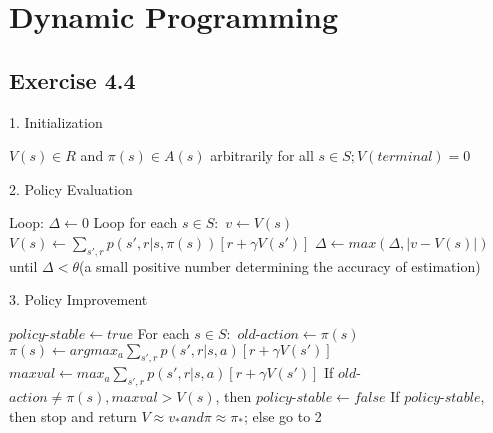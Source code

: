 \documentclass{report}
\begin{document}
\chapter{Dynamic Programming}

\section*{Exercise 4.4}
1. Initialization 
\begin{algorithmic}
\State $ V(s) \in R$ and $\pi(s) \in A(s)$ arbitrarily for all $s \in S; V(terminal)=0$
\end{algorithmic}
2. Policy Evaluation
\begin{algorithmic}
\State Loop:
\Indent
    \State $\Delta \leftarrow 0$
    \State Loop for each $s\in S:$
    \Indent
        \State $v \leftarrow V(s)$
        \State $V(s) \leftarrow \sum_{s',r}^{}p(s',r|s,\pi(s))[r+\gamma V(s')]$
        \State $\Delta \leftarrow max(\Delta,\left| v-V(s) \right|)$
    \EndIndent
    \State until $\Delta < \theta$(a small positive number determining the accuracy of estimation)
\EndIndent
\end{algorithmic}
3. Policy Improvement
\begin{algorithmic}
\State $policy$-$stable \leftarrow true$
\State For each $s \in S:$
\Indent
    \State $old$-$action \leftarrow \pi(s)$
    \State $\pi(s) \leftarrow argmax_a \sum_{s',r}p(s',r|s,a)[r+\gamma V(s')]$
    \State $maxval \leftarrow max_a \sum_{s',r}p(s',r|s,a)[r+\gamma V(s')]$
    \State If $old$-$action \neq \pi(s), maxval>V(s) $, then $policy$-$stable \leftarrow false$
\EndIndent
\State If $policy$-$stable$, then stop and return $V \approx v_* and \pi \approx \pi_*$; else go to 2
\end{algorithmic}
\end{document}
